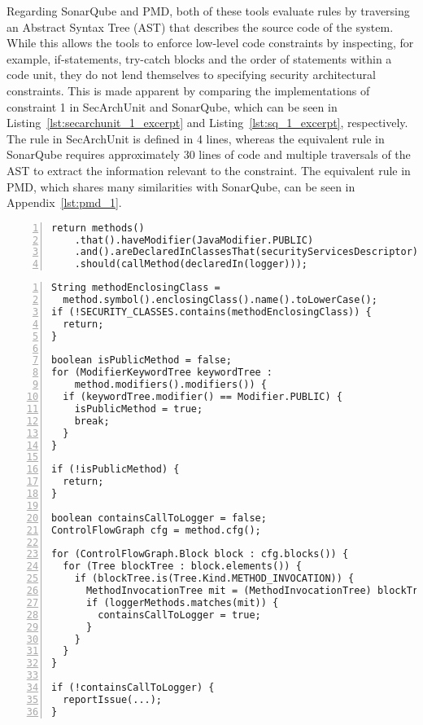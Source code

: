 Regarding SonarQube and PMD, both of these tools evaluate rules by traversing an Abstract Syntax Tree (AST) that describes the source code of the system. While this allows the tools to enforce low-level code constraints by inspecting, for example, if-statements, try-catch blocks and the order of statements within a code unit, they do not lend themselves to specifying security architectural constraints. This is made apparent by comparing the implementations of constraint 1 in SecArchUnit and SonarQube, which can be seen in Listing~\ref{lst:secarchunit_1_excerpt} and Listing~\ref{lst:sq_1_excerpt}, respectively. The rule in SecArchUnit is defined in 4 lines, whereas the equivalent rule in SonarQube requires approximately 30 lines of code and multiple traversals of the AST to extract the information relevant to the constraint. The equivalent rule in PMD, which shares many similarities with SonarQube, can be seen in Appendix~\ref{lst:pmd_1}.

\begin{lstlisting}[caption={Constraint 1 in SecArchUnit.}, captionpos=b, label=lst:secarchunit_1_excerpt, numbers=left, showstringspaces=false]
return methods()
    .that().haveModifier(JavaModifier.PUBLIC)
    .and().areDeclaredInClassesThat(securityServicesDescriptor)
    .should(callMethod(declaredIn(logger)));
\end{lstlisting}

\begin{lstlisting}[caption={Constraint 1 in SonarQube. The full class definition can be seen in Appendix~\ref{lst:sq_1}.}, captionpos=b, label=lst:sq_1_excerpt, numbers=left, showstringspaces=false]
String methodEnclosingClass =
  method.symbol().enclosingClass().name().toLowerCase();
if (!SECURITY_CLASSES.contains(methodEnclosingClass)) {
  return;
}

boolean isPublicMethod = false;
for (ModifierKeywordTree keywordTree : 
    method.modifiers().modifiers()) {
  if (keywordTree.modifier() == Modifier.PUBLIC) {
    isPublicMethod = true;
    break;
  }
}

if (!isPublicMethod) {
  return;
}

boolean containsCallToLogger = false;
ControlFlowGraph cfg = method.cfg();

for (ControlFlowGraph.Block block : cfg.blocks()) {
  for (Tree blockTree : block.elements()) {
    if (blockTree.is(Tree.Kind.METHOD_INVOCATION)) {
      MethodInvocationTree mit = (MethodInvocationTree) blockTree;
      if (loggerMethods.matches(mit)) {
        containsCallToLogger = true;
      }
    }
  }
}

if (!containsCallToLogger) {
  reportIssue(...);
}
\end{lstlisting}

